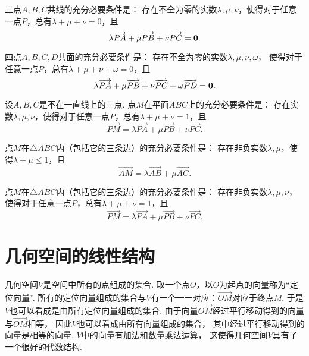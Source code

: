 \begin{theorem}
三点\(A,B,C\)共线的充分必要条件是：
存在不全为零的实数\(\lambda,\mu,\nu\)，使得对于任意一点\(P\)，总有\(\lambda+\mu+\nu=0\)，且\[
\lambda \overrightarrow{PA} + \mu \overrightarrow{PB} + \nu \overrightarrow{PC} = \boldsymbol{0}.
\]
\end{theorem}

\begin{theorem}
四点\(A,B,C,D\)共面的充分必要条件是：
存在不全为零的实数\(\lambda,\mu,\nu,\omega\)，
使得对于任意一点\(P\)，总有\(\lambda+\mu+\nu+\omega=0\)，且\[
\lambda \overrightarrow{PA} + \mu \overrightarrow{PB} + \nu \overrightarrow{PC} + \omega \overrightarrow{PD} = \boldsymbol{0}.
\]
\end{theorem}

\begin{theorem}
设\(A,B,C\)是不在一直线上的三点.
点\(M\)在平面\(ABC\)上的充分必要条件是：
存在实数\(\lambda,\mu,\nu\)，使得对于任意一点\(P\)，总有\(\lambda+\mu+\nu=1\)，且\[
\vec{PM} = \lambda \vec{PA} + \mu \vec{PB} + \nu \vec{PC}.
\]
\end{theorem}

\begin{theorem}
点\(M\)在\(\triangle ABC\)内（包括它的三条边）的充分必要条件是：
存在非负实数\(\lambda,\mu\)，使得\(\lambda+\mu\leq1\)，且\[
\vec{AM} = \lambda \vec{AB} + \mu \vec{AC}.
\]
\end{theorem}

\begin{theorem}
点\(M\)在\(\triangle ABC\)内（包括它的三条边）的充分必要条件是：
存在非负实数\(\lambda,\mu,\nu\)，使得对于任意一点\(P\)，总有\(\lambda+\mu+\nu=1\)，且\[
\vec{PM} = \lambda \vec{PA} + \mu \vec{PB} + \nu \vec{PC}.
\]
\end{theorem}

\section{几何空间的线性结构}
几何空间\(V\)是空间中所有的点组成的集合.
取一个点\(O\)，以\(O\)为起点的向量称为“定位向量”.
所有的定位向量组成的集合与\(V\)有一个一一对应：\(\vec{OM}\)对应于终点\(M\).
于是\(V\)也可以看成是由所有定位向量组成的集合.
由于向量\(\vec{OM}\)经过平行移动得到的向量与\(\vec{OM}\)相等，
因此\(V\)也可以看成由所有向量组成的集合，
其中经过平行移动得到的向量是相等的向量.
\(V\)中的向量有加法和数量乘法运算，
这使得几何空间\(V\)具有了一个很好的代数结构.

